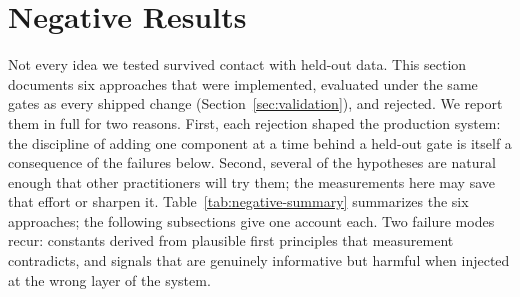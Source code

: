 \section{Negative Results}
\label{sec:negative-results}

Not every idea we tested survived contact with held-out data. This
section documents six approaches that were implemented, evaluated
under the same gates as every shipped change
(Section~\ref{sec:validation}), and rejected. We report them in full
for two reasons. First, each rejection shaped the production system:
the discipline of adding one component at a time behind a held-out
gate is itself a consequence of the failures below. Second, several
of the hypotheses are natural enough that other practitioners will
try them; the measurements here may save that effort or sharpen it.
Table~\ref{tab:negative-summary} summarizes the six approaches; the
following subsections give one account each. Two failure modes recur:
constants derived from plausible first principles that measurement
contradicts, and signals that are genuinely informative but harmful
when injected at the wrong layer of the system.

